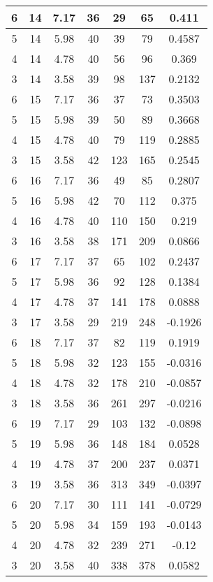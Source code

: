 \documentclass[letterpaper, 12pt]{article}
\begin{document}
\begin{longtable}{|c|c|c|c|c|c|c|}
\hline
6 & 14 & 7.17 & 36 & 29 & 65 & 0.411 \\
\hline
5 & 14 & 5.98 & 40 & 39 & 79 & 0.4587 \\
\hline
4 & 14 & 4.78 & 40 & 56 & 96 & 0.369 \\
\hline
3 & 14 & 3.58 & 39 & 98 & 137 & 0.2132 \\
\hline
6 & 15 & 7.17 & 36 & 37 & 73 & 0.3503 \\
\hline
5 & 15 & 5.98 & 39 & 50 & 89 & 0.3668 \\
\hline
4 & 15 & 4.78 & 40 & 79 & 119 & 0.2885 \\
\hline
3 & 15 & 3.58 & 42 & 123 & 165 & 0.2545 \\
\hline
6 & 16 & 7.17 & 36 & 49 & 85 & 0.2807 \\
\hline
5 & 16 & 5.98 & 42 & 70 & 112 & 0.375 \\
\hline
4 & 16 & 4.78 & 40 & 110 & 150 & 0.219 \\
\hline
3 & 16 & 3.58 & 38 & 171 & 209 & 0.0866 \\
\hline
6 & 17 & 7.17 & 37 & 65 & 102 & 0.2437 \\
\hline
5 & 17 & 5.98 & 36 & 92 & 128 & 0.1384 \\
\hline
4 & 17 & 4.78 & 37 & 141 & 178 & 0.0888 \\
\hline
3 & 17 & 3.58 & 29 & 219 & 248 & -0.1926 \\
\hline
6 & 18 & 7.17 & 37 & 82 & 119 & 0.1919 \\
\hline
5 & 18 & 5.98 & 32 & 123 & 155 & -0.0316 \\
\hline
4 & 18 & 4.78 & 32 & 178 & 210 & -0.0857 \\
\hline
3 & 18 & 3.58 & 36 & 261 & 297 & -0.0216 \\
\hline
6 & 19 & 7.17 & 29 & 103 & 132 & -0.0898 \\
\hline
5 & 19 & 5.98 & 36 & 148 & 184 & 0.0528 \\
\hline
4 & 19 & 4.78 & 37 & 200 & 237 & 0.0371 \\
\hline
3 & 19 & 3.58 & 36 & 313 & 349 & -0.0397 \\
\hline
6 & 20 & 7.17 & 30 & 111 & 141 & -0.0729 \\
\hline
5 & 20 & 5.98 & 34 & 159 & 193 & -0.0143 \\
\hline
4 & 20 & 4.78 & 32 & 239 & 271 & -0.12 \\
\hline
3 & 20 & 3.58 & 40 & 338 & 378 & 0.0582 \\
\hline
\end{longtable}
\end{document}
